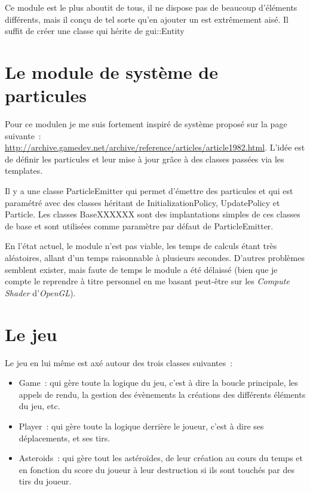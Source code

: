 \documentclass[10pt, french, a4paper]{report}
\newcommand{\class}[1]{{\codefont \NoAutoSpacing \mbox{#1}}}
\begin{document}
Ce module est le plus aboutit de tous, il ne dispose pas de beaucoup d'éléments
différents, mais il conçu de tel sorte qu'en ajouter un est extrêmement aisé.
Il suffit de créer une classe qui hérite de \class{gui::Entity} 

\section{Le module de système de particules}
 
Pour ce modulen je me suis fortement inspiré de système proposé sur la page suivante~:
\url{http://archive.gamedev.net/archive/reference/articles/article1982.html}.
L'idée est de définir les particules et leur mise à jour grâce à des classes
passées via les templates.

Il y a une classe \class{ParticleEmitter} qui permet d'émettre des particules et qui 
est paramétré avec des classes héritant de \class{InitializationPolicy}, 
\class{UpdatePolicy} et \class{Particle}. 
Les classes \class{BaseXXXXXX} sont des implantations simples de ces classes de base et
sont utilisées comme paramètre par défaut de \class{ParticleEmitter}.

En l'état actuel, le module n'est pas viable, les temps de calculs étant très aléatoires,
allant d'un temps raisonnable à plusieurs secondes. D'autres problèmes semblent
exister, mais faute de temps le module a été délaissé (bien que je compte le reprendre
à titre personnel en me basant peut-être sur les \textit{Compute Shader} 
d'\textit{OpenGL}).

\section{Le jeu}

Le jeu en lui même est axé autour des trois classes suivantes~:
\begin{itemize}
	\item \class{Game}~: qui gère toute la logique du jeu, c'est à dire la boucle
		  principale, les appels de rendu, la gestion des évènements la créations
		  des différents éléments du jeu, etc.
	\item \class{Player}~: qui gère toute la logique derrière le joueur, c'est à dire
		  ses déplacements, et ses tirs.
	\item \class{Asteroids}~: qui gère tout les astéroïdes, de leur création au cours
		  du temps et en fonction du score du joueur à leur destruction si ils sont
		  touchés par des tirs du joueur. 
\end{itemize}
\end{document}
